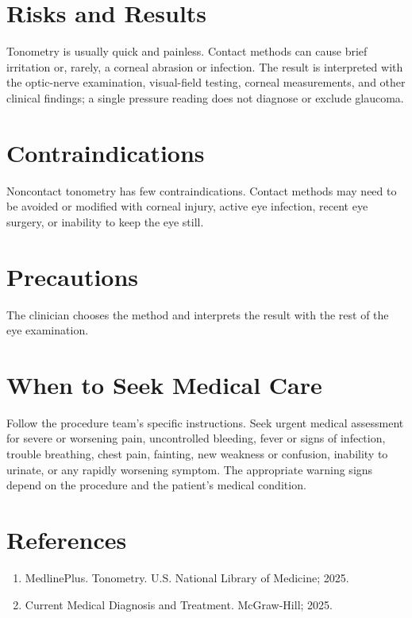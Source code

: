 \section*{Risks and Results}
Tonometry is usually quick and painless. Contact methods can cause brief irritation or, rarely, a corneal abrasion or infection. The result is interpreted with the optic-nerve examination, visual-field testing, corneal measurements, and other clinical findings; a single pressure reading does not diagnose or exclude glaucoma.

\section*{Contraindications}
Noncontact tonometry has few contraindications. Contact methods may need to be avoided or modified with corneal injury, active eye infection, recent eye surgery, or inability to keep the eye still.

\section*{Precautions}
The clinician chooses the method and interprets the result with the rest of the eye examination.

\section*{When to Seek Medical Care}
Follow the procedure team's specific instructions. Seek urgent medical assessment for severe or worsening pain, uncontrolled bleeding, fever or signs of infection, trouble breathing, chest pain, fainting, new weakness or confusion, inability to urinate, or any rapidly worsening symptom. The appropriate warning signs depend on the procedure and the patient's medical condition.

\section*{References}
\begin{enumerate}
  \item MedlinePlus. Tonometry. U.S. National Library of Medicine; 2025.
  \item Current Medical Diagnosis and Treatment. McGraw-Hill; 2025.
\end{enumerate}
\clearpage
